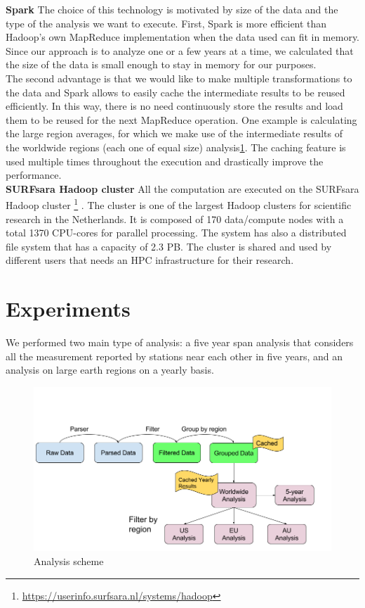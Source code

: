 \documentclass{vldb}
\begin{document}
\textbf{Spark}
The choice of this technology is motivated by size of the data and the type of the analysis we want to execute. First, Spark is more efficient than Hadoop's own MapReduce\cite{dean2008mapreduce} implementation when the data used can fit in memory. Since our approach is to analyze one or a few years at a time, we calculated that the size of the data is small enough to stay in memory for our purposes. \\
The second advantage is that we would like to make multiple transformations to the data and Spark allows to easily cache the intermediate results to be reused efficiently. In this way, there is no need continuously store the results and load them to be reused for the next MapReduce operation. One example is calculating the large region averages, for which we make use of the intermediate results of the worldwide regions (each one of equal size) analysis\ref{fig:analysis}. The caching feature is used multiple times throughout the execution and drastically improve the performance. \\

\textbf{SURFsara Hadoop cluster}
All the computation are executed on the SURFsara Hadoop cluster \footnote{\href{SURFsara Hadoop Cluster}{https://userinfo.surfsara.nl/systems/hadoop}} . The cluster is one of the largest Hadoop clusters for scientific research in the Netherlands. It is composed of 170 data/compute nodes with a total 1370 CPU-cores for parallel processing. The system has also a distributed file system that has a capacity of 2.3 PB. The cluster is shared and used by different users that needs an HPC infrastructure for their research.   

\section{Experiments}
\label{sec:exp}
We performed two main type of analysis: a five year span analysis that considers all the measurement reported by stations near each other in five years, and an analysis on large earth regions on a yearly basis. \\

\begin{figure}[tbh]
\includegraphics[width=1\linewidth]{analysis}
\caption{Analysis scheme}
\label{fig:analysis}
\end{figure}
\end{document}
